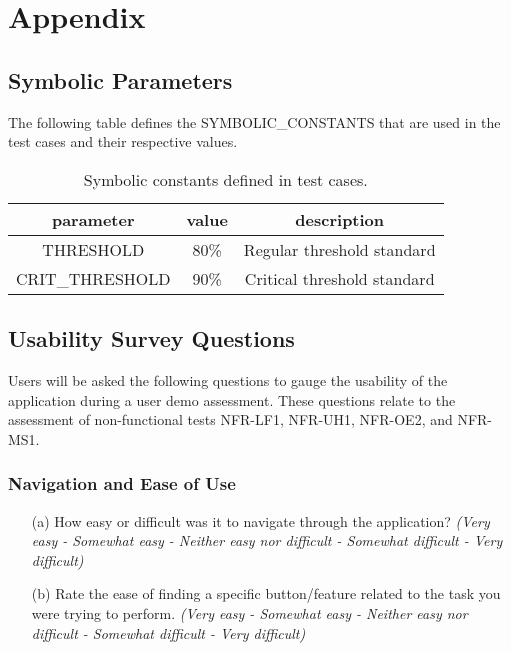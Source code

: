 \documentclass[12pt, titlepage]{article}
\begin{document}
				
%

%

\newpage

\section{Appendix}

\subsection{Symbolic Parameters}

The following table defines the SYMBOLIC\_CONSTANTS that are used in the test
cases and their respective values.

\bigskip

\begin{table}[htb]
\caption{Symbolic constants defined in test cases.}
\centering
\begin{tabular}{c c c}
  \toprule
  \textbf{parameter} & \textbf{value} & \textbf{description}\\
  \midrule 
  THRESHOLD & 80\% & Regular threshold standard\\
  CRIT\_THRESHOLD & 90\% & Critical threshold standard\\
  \bottomrule
\end{tabular}
\end{table}

\subsection{Usability Survey Questions} \label{usabilitySurvey}

Users will be asked the following questions to gauge the usability of the
application during a user demo assessment. These questions relate to
the assessment of non-functional tests NFR-LF1, NFR-UH1, NFR-OE2, and NFR-MS1.

\subsubsection*{\textbf{Navigation and Ease of Use}}
  \begin{itemize}
    \item[(a)] How easy or difficult was it to navigate through the
    application? \textit{(Very easy - Somewhat easy - Neither easy nor difficult
    - Somewhat difficult - Very difficult)}
    \item[(b)] Rate the ease of finding a specific button/feature related to the
    task you were trying to perform. \textit{(Very easy - Somewhat easy -
    Neither easy nor difficult - Somewhat difficult - Very difficult)}
  \end{itemize}
\end{document}
